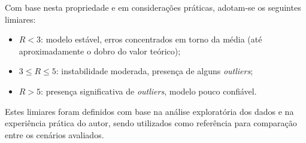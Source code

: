 Com base nesta propriedade e em considerações práticas, adotam-se os seguintes limiares:

\begin{itemize}
    \item $R < 3$: modelo estável, erros concentrados em torno da média (até aproximadamente o dobro do valor teórico);
    \item $3 \leq R \leq 5$: instabilidade moderada, presença de alguns \textit{outliers};
    \item $R > 5$: presença significativa de \textit{outliers}, modelo pouco confiável.
\end{itemize}

Estes limiares foram definidos com base na análise exploratória dos dados e na experiência prática do autor, sendo utilizados como referência para comparação entre os cenários avaliados.